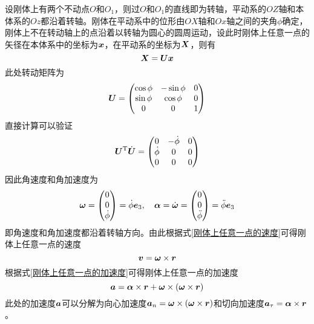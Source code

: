 设刚体上有两个不动点$O$和$O_1$，则过$O$和$O_1$的直线即为转轴，平动系的$OZ$轴和本体系的$Oz$都沿着转轴。刚体在平动系中的位形由$OX$轴和$Ox$轴之间的夹角$\phi$确定，刚体上不在转动轴上的点沿着以转轴为圆心的圆周运动，设此时刚体上任意一点的矢径在本体系中的坐标为$\boldsymbol{x}$，在平动系的坐标为$\boldsymbol{X}$，则有
\begin{equation*}
	\boldsymbol{X} = \boldsymbol{U} \boldsymbol{x}
\end{equation*}
此处转动矩阵为
\begin{equation}
	\boldsymbol{U} = \begin{pmatrix} \cos \phi & -\sin \phi & 0 \\ \sin \phi & \cos \phi & 0 \\ 0 & 0 & 1 \end{pmatrix}
	\label{定轴转动的转动矩阵}
\end{equation}
直接计算可以验证
\begin{equation*}
	\boldsymbol{U}^{\mathrm{T}} \dot{\boldsymbol{U}} = \begin{pmatrix} 0 & -\dot{\phi} & 0 \\ \dot{\phi} & 0 & 0 \\ 0 & 0 & 0 \end{pmatrix}
\end{equation*}
因此角速度和角加速度为
\begin{equation*}
	\boldsymbol{\omega} = \begin{pmatrix} 0 \\ 0 \\ \dot{\phi} \end{pmatrix} = \dot{\phi} \boldsymbol{e}_3,\quad \boldsymbol{\alpha} = \dot{\boldsymbol{\omega}} = \begin{pmatrix} 0 \\ 0 \\ \ddot{\phi} \end{pmatrix} = \ddot{\phi} \boldsymbol{e}_3
\end{equation*}
即角速度和角加速度都沿着转轴方向。由此根据式\eqref{刚体上任意一点的速度}可得刚体上任意一点的速度
\begin{equation*}
	\boldsymbol{v} = \boldsymbol{\omega} \times \boldsymbol{r}
\end{equation*}
根据式\eqref{刚体上任意一点的加速度}可得刚体上任意一点的加速度
\begin{equation*}
	\boldsymbol{a} = \boldsymbol{\alpha} \times \boldsymbol{r} + \boldsymbol{\omega} \times (\boldsymbol{\omega} \times \boldsymbol{r})
\end{equation*}
此处的加速度$\boldsymbol{a}$可以分解为向心加速度$\boldsymbol{a}_n = \boldsymbol{\omega} \times (\boldsymbol{\omega} \times \boldsymbol{r})$和切向加速度$\boldsymbol{a}_\tau = \boldsymbol{\alpha} \times \boldsymbol{r}$。

